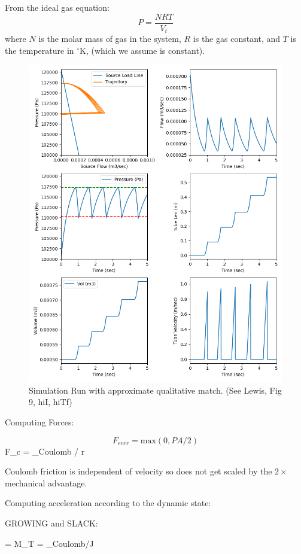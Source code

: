 \documentclass[letterpaper]{article}
\begin{document}
From the ideal gas equation:
\begin{equation}\label{eqOneCompartmentPress}
P = \frac{N  R  T}{ V_t}
\end{equation}
where $N$ is the molar mass of gas in the system, $R$ is the gas constant, and $T$ is the temperature
in $^\circ$K, (which we assume is constant).

\begin{figure}\centering
\includegraphics[width=.75\textwidth]{Figure_9HhiI_hiTf_baseline.png}
\caption{Simulation Run with approximate qualitative match.  (See Lewis, Fig 9, hiI, hiTf)}
\label{Fig:baselineResults}
\end{figure}

Computing Forces:


\begin{equation}
  F_{ever} = \mathrm{max}(0, PA/2)
\end{equation}
\beq
  F_{c} = \tau_{Coulomb} / r
\eeq

Coulomb friction is independent of velocity so does not get scaled by the $2\times$ mechanical advantage.

Computing acceleration according to the dynamic state:

GROWING and SLACK:

\beq
{} =   {M_T}
\eeq
\beq
\dot{\theta} = \tau_{Coulomb}/J
\eeq
\end{document}
